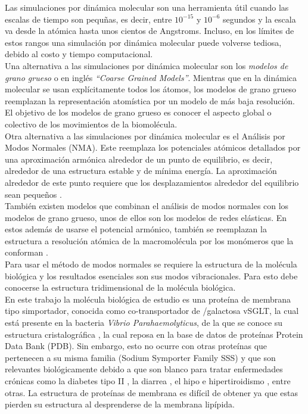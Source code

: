 Las simulaciones por din\'{a}mica molecular son una herramienta \'{u}til cuando las escalas de tiempo son pequ\~{n}as, es decir, entre $10^{-15}$ y  $10^{-6}$ segundos y la escala va desde la at\'{o}mica hasta unos cientos de Angstroms. Incluso, en los l\'{i}mites de estos rangos una simulaci\'{o}n por din\'{a}mica molecular puede volverse tediosa, debido al costo y tiempo computacional.\\

Una alternativa a las simulaciones por din\'{a}mica molecular son los \textit{modelos de grano grueso} o en ingl\'{e}s \textit{``Coarse Grained Models''}.  Mientras que en la din\'{a}mica molecular se usan expl\'{i}citamente todos los \'{a}tomos, los modelos de grano grueso reemplazan la representaci\'{o}n atom\'{i}stica por un modelo de m\'{a}s baja resoluci\'{o}n. El objetivo de los modelos de grano grueso es conocer el aspecto global o colectivo de los movimientos de la biomol\'{e}cula. \\

Otra alternativa a las simulaciones por din\'{a}mica molecular es el An\'{a}lisis por Modos Normales (NMA). Este reemplaza los potenciales at\'{o}micos detallados por una aproximaci\'{o}n arm\'{o}nica alrededor de un punto de equilibrio, es decir, alrededor de una estructura estable y de m\'{i}nima energ\'{i}a. La aproximaci\'{o}n alrededor de este punto requiere que los desplazamientos alrededor del equilibrio sean peque\~{n}os \cite{Lezon2009}.\\

Tambi\'{e}n existen modelos que combinan el an\'{a}lisis de modos normales con los modelos de grano grueso, unos de ellos son los modelos de redes el\'{a}sticas. En estos adem\'{a}s de usarse el potencial arm\'{o}nico, tambi\'{e}n se reemplazan la estructura a resoluci\'{o}n at\'{o}mica de la macromol\'{e}cula por los mon\'{o}meros que la conforman \cite{Lezon2009}.\\

Para usar el m\'{e}todo de modos normales se requiere la estructura de la mol\'{e}cula biol\'{o}gica y los resultados esenciales son sus modos vibracionales. Para esto debe conocerse la estructura tridimensional de la mol\'{e}cula biol\'{o}gica.\\

En este trabajo la mol\'{e}cula biol\'{o}gica de estudio es una prote\'{i}na de membrana tipo simportador, conocida como co-transportador de /galactosa vSGLT, la cual est\'{a} presente en la bacteria \textit{Vibrio Parahaemolyticus}, de la que se conoce su estructura cristalogr\'{a}fica \cite{Faham2008}, la cual reposa en la base de datos de prote\'{i}nas Protein Data Bank (PDB). Sin embargo, esto no ocurre con otras prote\'{i}nas que pertenecen a su misma familia (Sodium Symporter Family SSS) y que son relevantes biol\'{o}gicamente debido a que son blanco  para tratar enfermedades cr\'{o}nicas como la diabetes tipo II \cite{Bisha2014}, la diarrea \cite{Hamilton2013}, el hipo e hipertiroidismo \cite{Ferrandino2016}, entre otras. La estructura de prote\'{i}nas de membrana es dif\'{i}cil de obtener ya que estas pierden su estructura al desprenderse de la membrana lip\'{i}pida.\\

